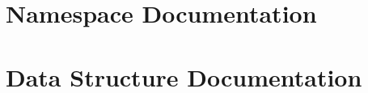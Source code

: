 \documentclass[twoside]{book}
\newcommand{\+}{\discretionary{\mbox{\scriptsize$\hookleftarrow$}}{}{}}
\begin{document}
\chapter{Namespace Documentation}



\chapter{Data Structure Documentation}




















\end{document}
